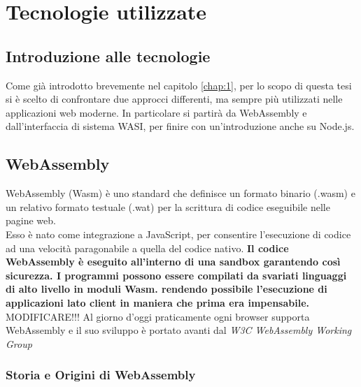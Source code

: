 \chapter{Tecnologie utilizzate}
\label{chap:2}

\section{Introduzione alle tecnologie}
\label{sec:IntroduzioneTecnologie}
Come già introdotto brevemente nel capitolo \ref{chap:1}, per lo scopo di questa tesi si è scelto di confrontare due approcci differenti, ma sempre più utilizzati nelle applicazioni web moderne.
In particolare si partirà da WebAssembly e dall'interfaccia di sistema WASI, per finire con un'introduzione anche su Node.js.

\section{WebAssembly}
\label{sec:Wasm}
WebAssembly (Wasm) è uno standard che definisce un formato binario (.wasm) e un relativo formato testuale (.wat) per la scrittura di codice eseguibile nelle pagine web. 
\\Esso è nato come integrazione a JavaScript, per consentire l'esecuzione di codice ad una velocità paragonabile a quella del codice nativo.
\textbf{Il codice WebAssembly è eseguito all'interno di una sandbox garantendo così sicurezza.
I programmi possono essere compilati da svariati linguaggi di alto livello in moduli Wasm. rendendo possibile l'esecuzione di applicazioni lato client in maniera che prima era impensabile.} MODIFICARE!!!
Al giorno d'oggi praticamente ogni browser supporta WebAssembly e il suo sviluppo è portato avanti dal \emph{W3C WebAssembly Working Group}

\subsection{Storia e Origini di WebAssembly}
